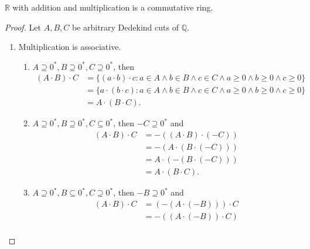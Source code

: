 \begin{theorem}
    $\mathbb{R}$ with addition and multiplication is a commutative ring.
\end{theorem}

\begin{proof}
    Let $A, B, C$ be arbitrary Dedekind cuts of $\mathbb{Q}$.
    \begin{enumerate}[label={(F\arabic*)}, start=5]
        \item Multiplication is associative.
              \begin{enumerate}[label={\textbf{Case \arabic*.}},topsep=0pt,itemsep=0pt]
                  \item $A\supseteq {0}^{*}, B\supseteq {0}^{*}, C\supseteq {0}^{*}$, then
                        \begin{align*}
                            (A\cdot B)\cdot C & = \{ (a\cdot b)\cdot c : a\in A\land b\in B\land c\in C\land a\ge 0\land b\ge 0\land c\ge 0 \} \\
                                              & = \{ a\cdot (b\cdot c) : a\in A\land b\in B\land c\in C\land a\ge 0\land b\ge 0\land c\ge 0 \} \\
                                              & = A\cdot (B\cdot C).
                        \end{align*}
                  \item $A\supseteq {0}^{*}, B\supseteq {0}^{*}, C\subseteq {0}^{*}$, then $-C\supseteq {0}^{*}$ and
                        \begin{align*}
                            (A\cdot B)\cdot C & = -\left( (A\cdot B)\cdot (-C) \right)  \\
                                              & = -\left( A\cdot (B \cdot (-C)) \right) \\
                                              & = A\cdot (-(B\cdot (-C)))               \\
                                              & = A\cdot (B\cdot C).
                        \end{align*}
                  \item $A\supseteq {0}^{*}, B\subseteq {0}^{*}, C\supseteq {0}^{*}$, then $-B\supseteq {0}^{*}$ and
                        \begin{align*}
                            (A\cdot B)\cdot C & = (-(A\cdot (-B)))\cdot C \\
                                              & = -((A\cdot (-B))\cdot C) \\

\end{align*}
\end{enumerate}
\end{enumerate}
\end{proof}
